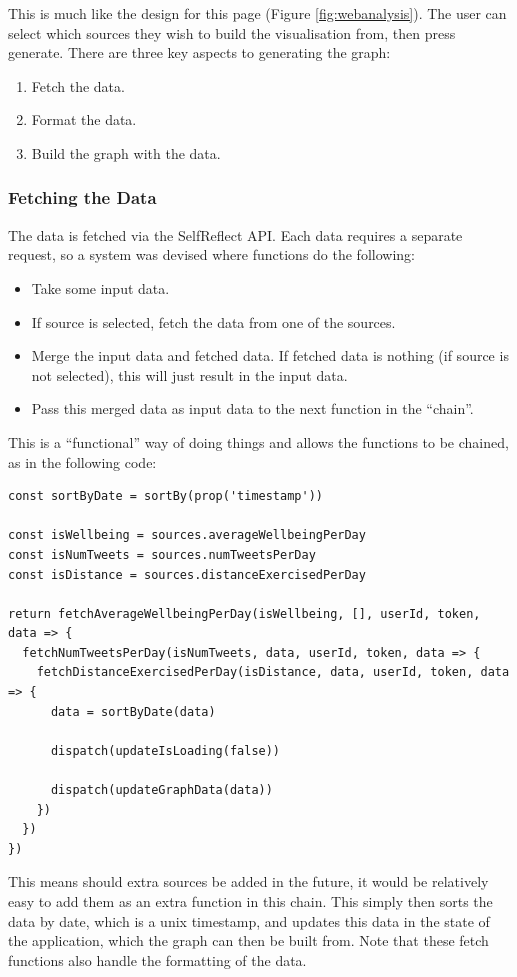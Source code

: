 \documentclass[11pt,openright,a4paper]{report}
\begin{document}
This is much like the design for this page (Figure \ref{fig:webanalysis}). The user can select which sources they wish to build the visualisation from, then press generate. There are three key aspects to generating the graph:
\begin{enumerate}
\item Fetch the data.
\item Format the data.
\item Build the graph with the data.
\end{enumerate}

\subsubsection{Fetching the Data}
The data is fetched via the SelfReflect API. Each data requires a separate request, so a system was devised where functions do the following:
\begin{itemize}
\item Take some input data.
\item If source is selected, fetch the data from one of the sources.
\item Merge the input data and fetched data. If fetched data is nothing (if source is not selected), this will just result in the input data.
\item Pass this merged data as input data to the next function in the \enquote{chain}.
\end{itemize}
This is a \enquote{functional} way of doing things and allows the functions to be chained, as in the following code:
\begin{lstlisting}
const sortByDate = sortBy(prop('timestamp'))

const isWellbeing = sources.averageWellbeingPerDay
const isNumTweets = sources.numTweetsPerDay
const isDistance = sources.distanceExercisedPerDay

return fetchAverageWellbeingPerDay(isWellbeing, [], userId, token, data => {
  fetchNumTweetsPerDay(isNumTweets, data, userId, token, data => {
    fetchDistanceExercisedPerDay(isDistance, data, userId, token, data => {
      data = sortByDate(data)

      dispatch(updateIsLoading(false))

      dispatch(updateGraphData(data))
    })
  })
})
\end{lstlisting}

This means should extra sources be added in the future, it would be relatively easy to add them as an extra function in this chain. This simply then sorts the data by date, which is a unix timestamp, and updates this data in the state of the application, which the graph can then be built from. Note that these fetch functions also handle the formatting of the data.
\end{document}
